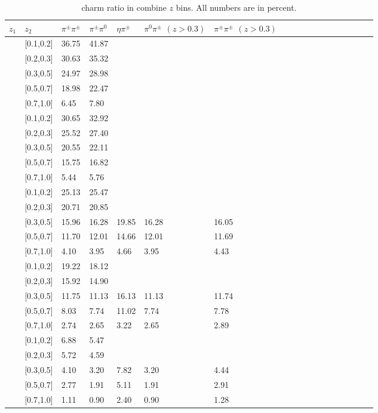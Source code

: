 \begin{table}[H]\footnotesize
\centering
\begin{tabular}{|l|l|l|l|l|l|l|l|l|l|l|l|l|l|l|l|l|l|}
\hline
 $z_1$& $z_2$ & $\pi^{\pm}\pi^{\pm}$ & $\pi^{\pm}\pi^0$ & $\eta\pi^{\pm}$ & $\pi^0\pi^{\pm}$ $(z>0.3)$ & $\pi^{\pm}\pi^{\pm}$ $(z>0.3)$ \\ \hline
[0.1,0.2]	&	[0.1,0.2]	&	36.75	&	41.87	&		&		&		\\ \hline
[0.1,0.2]	&	[0.2,0.3]	&	30.63	&	35.32	&		&		&		\\ \hline
[0.1,0.2]	&	[0.3,0.5]	&	24.97	&	28.98	&		&		&		\\ \hline
[0.1,0.2]	&	[0.5,0.7]	&	18.98	&	22.47	&		&		&		\\ \hline
[0.1,0.2]	&	[0.7,1.0]	&	6.45	&	7.80	&		&		&		\\ \hline
[0.2,0.3]	&	[0.1,0.2]	&	30.65	&	32.92	&		&		&		\\ \hline
[0.2,0.3]	&	[0.2,0.3]	&	25.52	&	27.40	&		&		&		\\ \hline
[0.2,0.3]	&	[0.3,0.5]	&	20.55	&	22.11	&		&		&		\\ \hline
[0.2,0.3]	&	[0.5,0.7]	&	15.75	&	16.82	&		&		&		\\ \hline
[0.2,0.3]	&	[0.7,1.0]	&	5.44	&	5.76	&		&		&		\\ \hline
[0.3,0.5]	&	[0.1,0.2]	&	25.13	&	25.47	&		&		&		\\ \hline
[0.3,0.5]	&	[0.2,0.3]	&	20.71	&	20.85	&		&		&		\\ \hline
[0.3,0.5]	&	[0.3,0.5]	&	15.96	&	16.28	&	19.85	&	16.28	&	16.05	\\ \hline
[0.3,0.5]	&	[0.5,0.7]	&	11.70	&	12.01	&	14.66	&	12.01	&	11.69	\\ \hline
[0.3,0.5]	&	[0.7,1.0]	&	4.10	&	3.95	&	4.66	&	3.95	&	4.43	\\ \hline
[0.5,0.7]	&	[0.1,0.2]	&	19.22	&	18.12	&		&		&		\\ \hline
[0.5,0.7]	&	[0.2,0.3]	&	15.92	&	14.90	&		&		&		\\ \hline
[0.5,0.7]	&	[0.3,0.5]	&	11.75	&	11.13	&	16.13	&	11.13	&	11.74	\\ \hline
[0.5,0.7]	&	[0.5,0.7]	&	8.03	&	7.74	&	11.02	&	7.74	&	7.78	\\ \hline
[0.5,0.7]	&	[0.7,1.0]	&	2.74	&	2.65	&	3.22	&	2.65	&	2.89	\\ \hline
[0.7,1.0]	&	[0.1,0.2]	&	6.88	&	5.47	&		&		&		\\ \hline
[0.7,1.0]	&	[0.2,0.3]	&	5.72	&	4.59	&		&		&		\\ \hline
[0.7,1.0]	&	[0.3,0.5]	&	4.10	&	3.20	&	7.82	&	3.20	&	4.44	\\ \hline
[0.7,1.0]	&	[0.5,0.7]	&	2.77	&	1.91	&	5.11	&	1.91	&	2.91	\\ \hline
[0.7,1.0]	&	[0.7,1.0]	&	1.11	&	0.90	&	2.40	&	0.90	&	1.28	\\ \hline
\end{tabular}
\caption{charm ratio in combine $z$ bins. All numbers are in percent.}
\label{tab:comzcharmratio}
\end{table}

